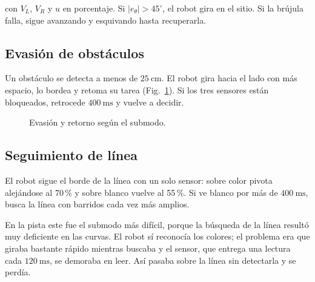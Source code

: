\documentclass[journal]{IEEEtran}
\begin{document}
con $V_L$, $V_R$ y $u$ en porcentaje. Si $|e_\theta|>45^\circ$, el robot gira en el sitio. Si la brújula falla, sigue avanzando y esquivando hasta recuperarla.

\subsection{Evasión de obstáculos}

Un obstáculo se detecta a menos de $25~\mathrm{cm}$. El robot gira hacia el lado con más espacio, lo bordea y retoma su tarea (Fig.~\ref{fig:evasion}). Si los tres sensores están bloqueados, retrocede $400~\mathrm{ms}$ y vuelve a decidir.

\begin{figure}[H]
\centering
{}
\caption{Evasión y retorno según el submodo.}
\label{fig:evasion}
\end{figure}

\subsection{Seguimiento de línea}

El robot sigue el borde de la línea con un solo sensor: sobre color pivota alejándose al 70\,\% y sobre blanco vuelve al 55\,\%. Si ve blanco por más de $400~\mathrm{ms}$, busca la línea con barridos cada vez más amplios.

En la pista este fue el submodo más difícil, porque la búsqueda de la línea resultó muy deficiente en las curvas. El robot sí reconocía los colores; el problema era que giraba bastante rápido mientras buscaba y el sensor, que entrega una lectura cada $120~\mathrm{ms}$, se demoraba en leer. Así pasaba sobre la línea sin detectarla y se perdía.
\end{document}
